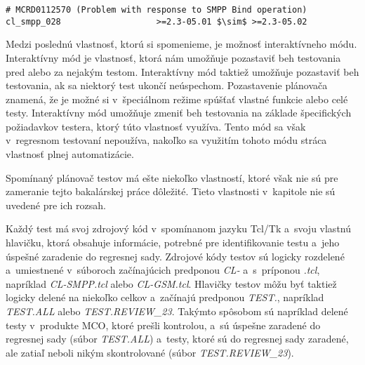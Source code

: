 \begin{lstlisting}[mathescape,caption=Príklad testu ktorý končí neúspechom pre verziu softvéru 2.3-05.01,
label=priklad:known_bug]
# MCRD0112570 (Problem with response to SMPP Bind operation)
cl_smpp_028                   >=2.3-05.01 $\sim$ >=2.3-05.02
\end{lstlisting}

Medzi poslednú vlastnosť, ktorú si spomenieme, je možnosť interaktívneho módu.
Interaktívny mód je vlastnosť, ktorá nám umožňuje pozastaviť beh 
testovania pred alebo za nejakým testom.
Interaktívny mód taktiež umožňuje pozastaviť beh testovania, ak sa niektorý test 
ukončí neúspechom. Pozastavenie plánovača znamená, že je možné si 
v~špeciálnom režime spúšťať vlastné funkcie alebo celé testy.
Interaktívny mód umožňuje zmeniť beh testovania na základe špecifických 
požiadavkov testera, ktorý túto vlastnosť využíva.
Tento mód sa však v~regresnom testovaní nepoužíva, nakoľko sa využitím 
tohoto módu stráca vlastnosť plnej automatizácie.

Spomínaný plánovač testov má ešte niekoľko vlastností, ktoré však nie sú
pre zameranie tejto bakalárskej práce dôležité. Tieto vlastnosti
v~kapitole nie sú uvedené pre ich rozsah. 

Každý test má svoj zdrojový kód v~spomínanom jazyku Tcl/Tk a~svoju 
vlastnú hlavičku, ktorá obsahuje informácie, potrebné pre identifikovanie 
testu a~jeho úspešné zaradenie do regresnej sady.
Zdrojové kódy testov sú logicky rozdelené a~umiestnené v~súboroch 
začínajúcich predponou \emph{CL-} a~s~príponou \emph{.tcl}, 
napríklad \emph{CL-SMPP.tcl} alebo \emph{CL-GSM.tcl}.
Hlavičky testov môžu byť taktiež logicky delené na niekoľko celkov 
a~začínajú predponou \emph{TEST.}, napríklad \emph{TEST.ALL} alebo 
\emph{TEST.REVIEW\_23}.
Takýmto spôsobom sú napríklad delené testy v~produkte MCO, ktoré prešli kontrolou,
a~sú úspešne zaradené do regresnej sady (súbor \emph{TEST.ALL}) a~testy, 
ktoré sú do regresnej sady zaradené, ale zatiaľ neboli nikým 
skontrolované (súbor \emph{TEST.REVIEW\_23}).

